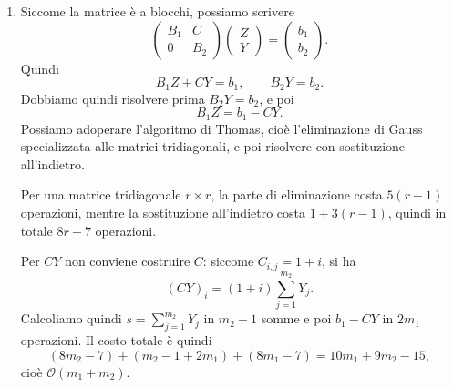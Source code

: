 \documentclass[a4paper]{article}
\begin{document}
\begin{snippetsolution}{}
\begin{enumerate}
        \item Siccome la matrice è a blocchi, possiamo scrivere
            \[
                \begin{pmatrix}
                    B_1 & C \\ 0 & B_2
                \end{pmatrix}
                \begin{pmatrix}
                    Z \\ Y
                \end{pmatrix}
                =
                \begin{pmatrix}
                    b_1 \\ b_2
                \end{pmatrix}.
            \]
            Quindi
            \[
                B_1Z + CY = b_1,
                \qquad
                B_2Y = b_2.
            \]
            Dobbiamo quindi risolvere prima \(B_2Y = b_2\), e poi
            \[
                B_1Z = b_1 - CY.
            \]
            Possiamo adoperare l'algoritmo di Thomas, cioè l'eliminazione di Gauss
            specializzata alle matrici tridiagonali, e poi risolvere con sostituzione
            all'indietro.

            Per una matrice tridiagonale \(r \times r\), la parte di eliminazione costa
            \(5(r-1)\) operazioni, mentre la sostituzione all'indietro costa
            \(1+3(r-1)\), quindi in totale \(8r - 7\) operazioni.

            Per \(CY\) non conviene costruire \(C\): siccome \(C_{i,j}=1+i\), si ha
            \[
                (CY)_i = (1+i)\sum_{j=1}^{m_2}Y_j.
            \]
            Calcoliamo quindi \(s=\sum_{j=1}^{m_2}Y_j\) in \(m_2-1\) somme e poi
            \(b_1-CY\) in \(2m_1\) operazioni.
            Il costo totale è quindi
            \[
                (8m_2 - 7) + (m_2 - 1 + 2m_1) + (8m_1 - 7)
                =
                10m_1 + 9m_2 - 15,
            \]
            cioè \(\mathcal{O}(m_1+m_2)\).


\end{enumerate}
\end{snippetsolution}
\end{document}
